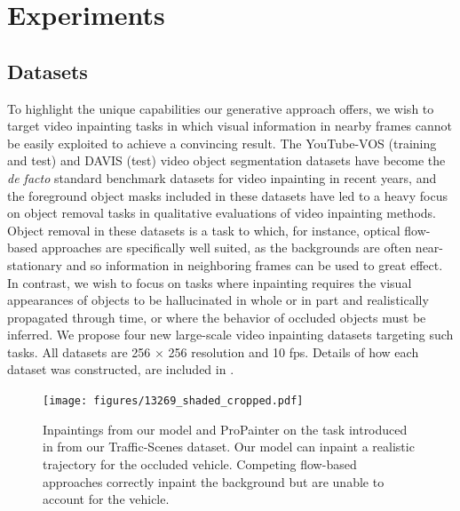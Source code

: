 \chapter{Experiments}
\section{Datasets}
To highlight the unique capabilities our generative approach offers, we wish to target video inpainting tasks in which visual information in nearby frames cannot be easily exploited to achieve a convincing result. The YouTube-VOS \citep{youtubevos1} (training and test) and DAVIS \citep{davis} (test) video object segmentation datasets have become the \emph{de facto} standard benchmark datasets for video inpainting in recent years, and the foreground object masks included in these datasets have led to a heavy focus on object removal tasks in qualitative evaluations of video inpainting methods. Object removal in these datasets is a task to which, for instance, optical flow-based approaches are specifically well suited, as the backgrounds are often near-stationary and so information in neighboring frames can be used to great effect. In contrast, we wish to focus on tasks where inpainting requires the visual appearances of objects to be hallucinated in whole or in part and realistically propagated through time, or where the behavior of occluded objects must be inferred. We propose four new large-scale video inpainting datasets targeting such tasks. All datasets are 256 $\times$ 256 resolution and 10 fps. Details of how each dataset was constructed, are included in .
\begin{figure}[t]
\centering
\texttt{[image: figures/13269\_shaded\_cropped.pdf]}
\caption[Inpaintings from our model and ProPainter on the task introduced in  from our Traffic-Scenes dataset.]{Inpaintings from our model and ProPainter on the task introduced in  from our Traffic-Scenes dataset. Our model can inpaint a realistic trajectory for the occluded vehicle. Competing flow-based approaches correctly inpaint the background but are unable to account for the vehicle.}
\label{fig:traffic-scenes}
\end{figure}

